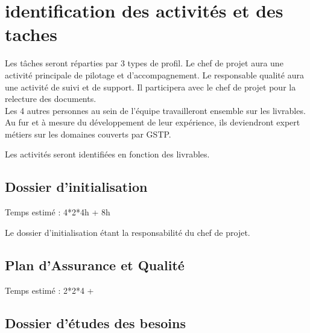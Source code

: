 \section{identification des activités et des taches}

Les tâches seront réparties par 3 types de profil. Le chef de projet aura une activité principale de pilotage et d'accompagnement. 
Le responsable qualité aura une activité de suivi et de support. Il participera avec le chef de projet pour la relecture des documents. \\

Les 4 autres personnes au sein de l'équipe travailleront ensemble sur les livrables.
Au fur et à mesure du développement de leur expérience, ils deviendront expert métiers sur les domaines couverts par GSTP. 

Les activités seront identifiées en fonction des livrables. 

\subsection{Dossier d'initialisation}

Temps estimé : 4*2*4h + 8h

Le dossier d'initialisation étant la responsabilité du chef de projet. 

\subsection{Plan d'Assurance et Qualité}

Temps estimé : 2*2*4 + 

\subsection{Dossier d'études des besoins}
\subsubsection{}
